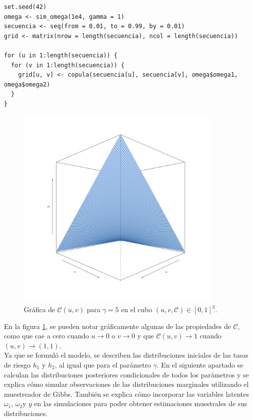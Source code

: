 \documentclass[11pt,a4paper]{article}
\newcommand{\C}{\mathcal{C}}
\begin{document}
\begin{lstlisting}
set.seed(42)
omega <- sim_omega(1e4, gamma = 1)
secuencia <- seq(from = 0.01, to = 0.99, by = 0.01)
grid <- matrix(nrow = length(secuencia), ncol = length(secuencia))

for (u in 1:length(secuencia)) {
  for (v in 1:length(secuencia)) {
    grid[u, v] <- copula(secuencia[u], secuencia[v], omega$omega1, omega$omega2)
  }
} 
\end{lstlisting}\leavevmode\newline

\begin{figure}[h]
\centering\includegraphics[width=10cm]{copula_5.png}
\caption{Gráfica de $\C (u, v)$ para $\gamma = 5$ en el cubo $(u, v, \C) \in [0, 1]^3$.}
\label{fig:copula}
\end{figure}

En la figura \ref{fig:copula}, se pueden notar gráficamente algunas de las propiedades de $\C$, como que cae a cero cuando $u \to 0$ o $v \to 0$ y que $\C (u, v) \to 1$ cuando $(u, v) \to (1, 1)$.\\

Ya que se formuló el modelo, se describen las distribuciones iniciales de las tasas de riesgo $h_1$ y $h_2$, al igual que para el parámetro $\gamma$. En el siguiente apartado se calculan las distribuciones posteriores condicionales de todos los parámetros y se explica cómo simular observaciones de las distribuciones marginales utilizando el muestreador de Gibbs. También se explica cómo incorporar las variables latentes $\omega_1$, $\omega_2$y $y$ en las simulaciones para poder obtener estimaciones muestrales de sus distribuciones.
\end{document}
